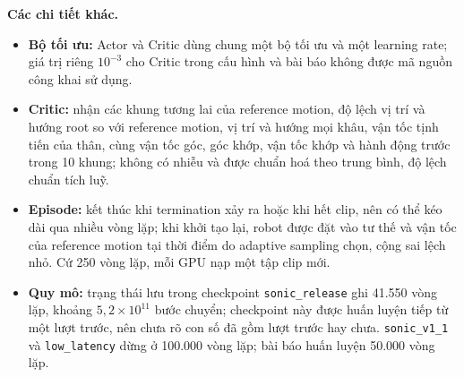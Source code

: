 \documentclass[12pt,a4paper,oneside]{report}
\newcommand{\code}[1]{\texttt{#1}}
\begin{document}
\textbf{Các chi tiết khác.}
\begin{itemize}
\item \textbf{Bộ tối ưu:} Actor và Critic dùng chung một bộ tối ưu và một learning rate; giá trị riêng $10^{-3}$ cho Critic trong cấu hình và bài báo không được mã nguồn công khai sử dụng.
\item \textbf{Critic:} nhận các khung tương lai của reference motion, độ lệch vị trí và hướng root so với reference motion, vị trí và hướng mọi khâu, vận tốc tịnh tiến của thân, cùng vận tốc góc, góc khớp, vận tốc khớp và hành động trước trong 10 khung; không có nhiễu và được chuẩn hoá theo trung bình, độ lệch chuẩn tích luỹ.
\item \textbf{Episode:} kết thúc khi termination xảy ra hoặc khi hết clip, nên có thể kéo dài qua nhiều vòng lặp; khi khởi tạo lại, robot được đặt vào tư thế và vận tốc của reference motion tại thời điểm do adaptive sampling chọn, cộng sai lệch nhỏ. Cứ 250 vòng lặp, mỗi GPU nạp một tập clip mới.
\item \textbf{Quy mô:} trạng thái lưu trong checkpoint \code{sonic\_release} ghi 41.550 vòng lặp, khoảng $5{,}2 \times 10^{11}$ bước chuyển; checkpoint này được huấn luyện tiếp từ một lượt trước, nên chưa rõ con số đã gồm lượt trước hay chưa. \code{sonic\_v1\_1} và \code{low\_latency} dừng ở 100.000 vòng lặp; bài báo huấn luyện 50.000 vòng lặp.
\end{itemize}
\end{document}
